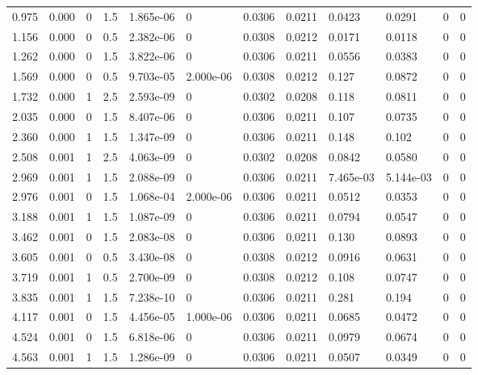 \documentclass[preview]{standalone}
\begin{document}
{{\begin{tabular}{L{1.2cm}C{1.2cm} C{0.3cm}C{0.5cm} C{1.4cm}C{1.4cm} C{1.4cm}C{1.4cm} C{1.6cm}C{1.6cm} C{1.6cm}C{1.6cm}}
  0.975  &  0.000  & 0     & 1.5 &  1.865e-06  & 0  &  0.0306&   0.0211& 0.0423 & 0.0291   &  0 & 0  \\ 
  1.156  &  0.000  & 0     & 0.5 &  2.382e-06  & 0  &  0.0308&   0.0212& 0.0171 & 0.0118   &  0 & 0  \\ 
  1.262  &  0.000  & 0     & 1.5 &  3.822e-06  & 0  &  0.0306&   0.0211& 0.0556 & 0.0383   &  0 & 0  \\ 
  1.569  &  0.000  & 0     & 0.5 &  9.703e-05  & 2.000e-06  &  0.0308&   0.0212& 0.127 & 0.0872   &  0 & 0  \\ 
  1.732  &  0.000  & 1     & 2.5 &  2.593e-09  & 0  &  0.0302&   0.0208& 0.118 & 0.0811   &  0 & 0  \\ 
  2.035  &  0.000  & 0     & 1.5 &  8.407e-06  & 0  &  0.0306&   0.0211& 0.107 & 0.0735   &  0 & 0  \\ 
  2.360  &  0.000  & 1     & 1.5 &  1.347e-09  & 0  &  0.0306&   0.0211& 0.148 & 0.102   &  0 & 0  \\ 
  2.508  &  0.001  & 1     & 2.5 &  4.063e-09  & 0  &  0.0302&   0.0208& 0.0842 & 0.0580   &  0 & 0  \\ 
  2.969  &  0.001  & 1     & 1.5 &  2.088e-09  & 0  &  0.0306&   0.0211& 7.465e-03 & 5.144e-03   &  0 & 0  \\ 
  2.976  &  0.001  & 0     & 1.5 &  1.068e-04  & 2.000e-06  &  0.0306&   0.0211& 0.0512 & 0.0353   &  0 & 0  \\ 
  3.188  &  0.001  & 1     & 1.5 &  1.087e-09  & 0  &  0.0306&   0.0211& 0.0794 & 0.0547   &  0 & 0  \\ 
  3.462  &  0.001  & 0     & 1.5 &  2.083e-08  & 0  &  0.0306&   0.0211& 0.130 & 0.0893   &  0 & 0  \\ 
  3.605  &  0.001  & 0     & 0.5 &  3.430e-08  & 0  &  0.0308&   0.0212& 0.0916 & 0.0631   &  0 & 0  \\ 
  3.719  &  0.001  & 1     & 0.5 &  2.700e-09  & 0  &  0.0308&   0.0212& 0.108 & 0.0747   &  0 & 0  \\ 
  3.835  &  0.001  & 1     & 1.5 &  7.238e-10  & 0  &  0.0306&   0.0211& 0.281 & 0.194   &  0 & 0  \\ 
  4.117  &  0.001  & 0     & 1.5 &  4.456e-05  & 1.000e-06  &  0.0306&   0.0211& 0.0685 & 0.0472   &  0 & 0  \\ 
  4.524  &  0.001  & 0     & 1.5 &  6.818e-06  & 0  &  0.0306&   0.0211& 0.0979 & 0.0674   &  0 & 0  \\ 
  4.563  &  0.001  & 1     & 1.5 &  1.286e-09  & 0  &  0.0306&   0.0211& 0.0507 & 0.0349   &  0 & 0  \\ 

\end{tabular}}}
\end{document}
